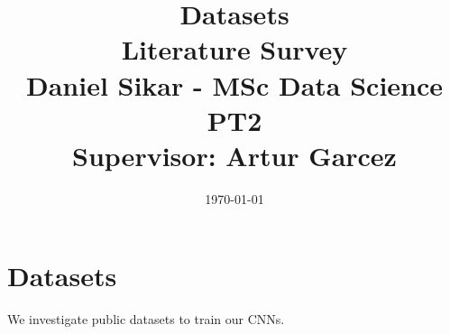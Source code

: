 \documentclass[a4paper,12pt]{article} %
\begin{document}
\title{%
  Datasets \\
  \medskip
  \large Literature Survey\\
    Daniel Sikar - MSc Data Science PT2\\
    Supervisor: Artur Garcez 
    }
\date{\today} %

\maketitle %


\section{Datasets}

We investigate public datasets to train our CNNs.







\pagebreak
\printbibliography
\pagebreak
\end{document}
